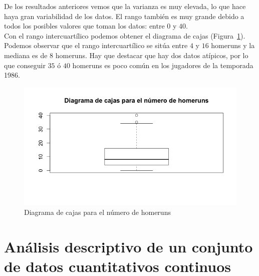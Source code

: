 \documentclass[12pt,a4paper,twoside,openright,titlepage,final]{article}
\begin{document}
De los resultados anteriores vemos que la varianza es muy elevada, lo que hace haya gran variabilidad de los datos. El rango también es muy grande debido a todos los posibles valores que toman los datos: entre $0$ y $40$.\\

Con el rango intercuartílico podemos obtener el diagrama de cajas (Figura~\ref{fig:diagrama_cajas_homeruns}). Podemos observar que el rango intercuartílico se sitúa entre $4$ y $16$ homeruns y la mediana es de $8$ homeruns. Hay que destacar que hay dos datos atípicos, por lo que conseguir $35$ ó $40$ homeruns es poco común en los jugadores de la temporada 1986.  

\begin{figure}[tbph!]
\centering
\includegraphics[width=0.8\linewidth]{imagenes/diagrama_cajas_homeruns}
\caption{Diagrama de cajas para el número de homeruns}
\label{fig:diagrama_cajas_homeruns}
\end{figure}

\section{Análisis descriptivo de un conjunto de datos cuantitativos continuos}
\end{document}
